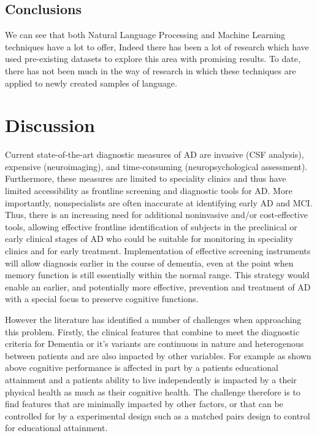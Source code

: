 \documentclass[10pt, letterpaper, twoside, openany]{book}
\begin{document}

\subsection{Conclusions}
We can see that both Natural Language Processing and Machine Learning techniques have a lot to offer, Indeed there has been a lot of research which have used pre-existing datasets to explore this area with promising results. To date, there has not been much in the way of research in which these techniques are applied to newly created samples of language. 

\section{Discussion}
Current state-of-the-art diagnostic measures of AD are invasive (CSF analysis), expensive (neuroimaging), and time-consuming (neuropsychological assessment). Furthermore, these measures are limited to speciality clinics and thus have limited accessibility as frontline screening and diagnostic tools for AD. More importantly, nonspecialists are often inaccurate at identifying early AD and MCI. Thus, there is an increasing need for additional noninvasive and/or cost-effective tools, allowing effective frontline identification of subjects in the preclinical or early clinical stages of AD who could be suitable for monitoring in speciality clinics and for early treatment. Implementation of effective screening instruments will allow diagnosis earlier in the course of dementia, even at the point when memory function is still essentially within the normal range. This strategy would enable an earlier, and potentially more effective, prevention and treatment of AD with a special focus to preserve cognitive functions.
\par 
However the literature has identified a number of challenges when approaching this problem. Firstly, the clinical features that combine to meet the diagnostic criteria for Dementia or it's variants are continuous in nature and heterogenous between patients and are also impacted by other variables. For example as shown above cognitive performance is affected in part by a patients educational attainment and a patients ability to live independently is impacted by a their physical health as much as their cognitive health. The challenge therefore is to find features that are minimally impacted by other factors, or that can be controlled for by a experimental design such as a matched pairs design to control for educational attainment.
\end{document}
